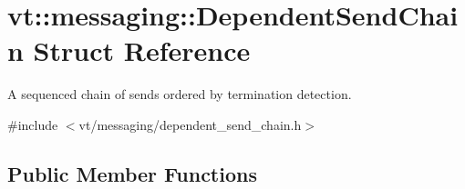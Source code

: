 \hypertarget{classvt_1_1messaging_1_1_dependent_send_chain}{}\section{vt\+:\+:messaging\+:\+:Dependent\+Send\+Chain Struct Reference}
\label{classvt_1_1messaging_1_1_dependent_send_chain}


A sequenced chain of sends ordered by termination detection.  




{\ttfamily \#include $<$vt/messaging/dependent\+\_\+send\+\_\+chain.\+h$>$}

\subsection*{Public Member Functions}
